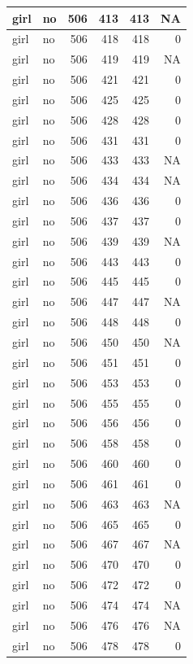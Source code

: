 \documentclass[man]{apa6}
\begin{document}
\begin{tabular}{l|l|r|r|r|r}
\hline
girl & no & 506 & 413 & 413 & NA\\
\hline
girl & no & 506 & 418 & 418 & 0\\
\hline
girl & no & 506 & 419 & 419 & NA\\
\hline
girl & no & 506 & 421 & 421 & 0\\
\hline
girl & no & 506 & 425 & 425 & 0\\
\hline
girl & no & 506 & 428 & 428 & 0\\
\hline
girl & no & 506 & 431 & 431 & 0\\
\hline
girl & no & 506 & 433 & 433 & NA\\
\hline
girl & no & 506 & 434 & 434 & NA\\
\hline
girl & no & 506 & 436 & 436 & 0\\
\hline
girl & no & 506 & 437 & 437 & 0\\
\hline
girl & no & 506 & 439 & 439 & NA\\
\hline
girl & no & 506 & 443 & 443 & 0\\
\hline
girl & no & 506 & 445 & 445 & 0\\
\hline
girl & no & 506 & 447 & 447 & NA\\
\hline
girl & no & 506 & 448 & 448 & 0\\
\hline
girl & no & 506 & 450 & 450 & NA\\
\hline
girl & no & 506 & 451 & 451 & 0\\
\hline
girl & no & 506 & 453 & 453 & 0\\
\hline
girl & no & 506 & 455 & 455 & 0\\
\hline
girl & no & 506 & 456 & 456 & 0\\
\hline
girl & no & 506 & 458 & 458 & 0\\
\hline
girl & no & 506 & 460 & 460 & 0\\
\hline
girl & no & 506 & 461 & 461 & 0\\
\hline
girl & no & 506 & 463 & 463 & NA\\
\hline
girl & no & 506 & 465 & 465 & 0\\
\hline
girl & no & 506 & 467 & 467 & NA\\
\hline
girl & no & 506 & 470 & 470 & 0\\
\hline
girl & no & 506 & 472 & 472 & 0\\
\hline
girl & no & 506 & 474 & 474 & NA\\
\hline
girl & no & 506 & 476 & 476 & NA\\
\hline
girl & no & 506 & 478 & 478 & 0\\

\end{tabular}
\end{document}
